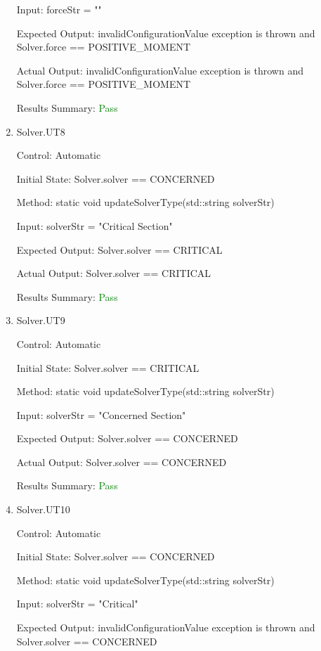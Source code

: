 \documentclass[12pt, titlepage]{article}
\begin{document}
\begin{enumerate}
    Input: forceStr = ""
    
    Expected Output: invalidConfigurationValue exception is thrown and Solver.force == POSITIVE\_MOMENT

    Actual Output: invalidConfigurationValue exception is thrown and Solver.force == POSITIVE\_MOMENT

    Results Summary: \textcolor{green} {Pass}

    \item{Solver.UT8\\}
    
    Control: Automatic

    Initial State: Solver.solver == CONCERNED
    
    Method: static void updateSolverType(std::string solverStr)
    
    Input: solverStr = "Critical Section"
    
    Expected Output: Solver.solver == CRITICAL

    Actual Output: Solver.solver == CRITICAL

    Results Summary: \textcolor{green} {Pass}

    \item{Solver.UT9\\}
    
    Control: Automatic

    Initial State: Solver.solver == CRITICAL
    
    Method: static void updateSolverType(std::string solverStr)
    
    Input: solverStr = "Concerned Section"
    
    Expected Output: Solver.solver == CONCERNED

    Actual Output: Solver.solver == CONCERNED

    Results Summary: \textcolor{green} {Pass}

    \item{Solver.UT10\\}
    
    Control: Automatic

    Initial State: Solver.solver == CONCERNED
    
    Method: static void updateSolverType(std::string solverStr)
    
    Input: solverStr = "Critical"
    
    Expected Output: invalidConfigurationValue exception is thrown and Solver.solver == CONCERNED


\end{enumerate}
\end{document}
